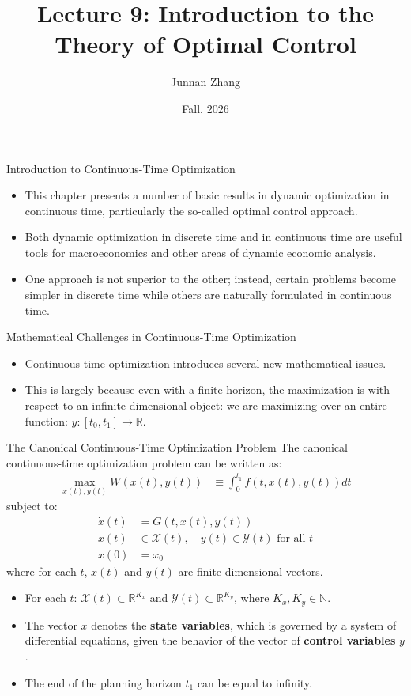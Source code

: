\documentclass[9pt,aspectratio=169]{beamer}
\title{Lecture 9: Introduction to the Theory of Optimal Control}
\author{Junnan Zhang} %
\institute[Paula and Gregory Chow Institute for Studies in Economics\\
Xiamen University] %
{
	Paula and Gregory Chow Institute for Studies in Economics \\ Xiamen University  \\ %
	\medskip
}
\date{Fall, 2026} %
\newcommand{\X}{\mathcal{X}}
\newcommand{\Y}{\mathcal{Y}}
\begin{document}
\frame{\titlepage}

\begin{frame}{Introduction to Continuous-Time Optimization}
    \begin{itemize}
        \item This chapter presents a number of basic results in dynamic
        optimization in continuous time, particularly the so-called optimal
        control approach.
        \item Both dynamic optimization in discrete time and in continuous
        time are useful tools for macroeconomics and other areas of dynamic
        economic analysis.
        \item One approach is not superior to the other; instead, certain
        problems become simpler in discrete time while others are naturally
        formulated in continuous time.
    \end{itemize}
\end{frame}

\begin{frame}{Mathematical Challenges in Continuous-Time Optimization}
    \begin{itemize}
        \item Continuous-time optimization introduces several new
        mathematical issues.
        \item This is largely because even with a finite horizon, the
        maximization is with respect to an infinite-dimensional object: we
        are maximizing over an entire function: $y : [t_0, t_1] \rightarrow
        \mathbb{R}$.
    \end{itemize}
\end{frame}

\begin{frame}{The Canonical Continuous-Time Optimization Problem}
The canonical continuous-time optimization problem can be written as:
\begin{align*}
\max_{x(t),y(t)} W(x(t), y(t)) &\equiv \int_0^{t_1} f(t, x(t), y(t))dt
\end{align*}
subject to:
\begin{align*}
\dot{x}(t) &= G(t, x(t), y(t))\\
x(t) &\in \X(t), \quad y(t) \in \Y(t) \text{ for all } t\\
x(0) &= x_0
\end{align*}
where for each $t$, $x(t)$ and $y(t)$ are finite-dimensional vectors.

\begin{itemize}
\item For each $t$: $\X(t) \subset \mathbb{R}^{K_x}$ and $\Y(t) \subset \mathbb{R}^{K_y}$, where $K_x, K_y \in \mathbb{N}$.
\item The vector $x$ denotes the \textbf{state variables}, which is governed by a
system of differential equations, given the behavior of the vector of \textbf{control
variables} $y$.
\item The end of the planning horizon $t_1$ can be equal to infinity.
\end{itemize}
\end{frame}
\end{document}
